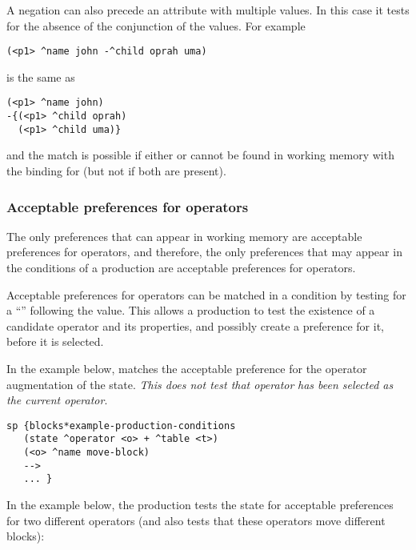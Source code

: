 A negation can also precede an attribute with multiple values.  In this case
it tests for the absence of the conjunction of the values.  For example

\begin{verbatim}
(<p1> ^name john -^child oprah uma)
\end{verbatim}

is the same as 

\begin{verbatim}
(<p1> ^name john)
-{(<p1> ^child oprah)
  (<p1> ^child uma)}
\end{verbatim}

and the match is possible if either  or
 cannot be found in working memory with the
binding for  (but not if both are present).

\subsubsection{Acceptable preferences for operators}
\label{SYNTAX-pm-acceptable}
\index{+}

The only preferences that can appear in working memory are acceptable
preferences for operators, and therefore, the only preferences that may appear
in the conditions of a production are acceptable preferences for operators.

Acceptable preferences for operators can be matched in a condition by testing
for a ``\soar{+}'' following the value.  This allows a production to test the
existence of a candidate operator and its properties, and possibly create a
preference for it, before it is selected.

In the example below,  matches the acceptable
preference for the operator augmentation of the state. \emph{This does not
test that operator}  \emph{has been selected as the current
operator}.

\begin{verbatim}
sp {blocks*example-production-conditions
   (state ^operator <o> + ^table <t>)
   (<o> ^name move-block)
   -->
   ... }
\end{verbatim}


In the example below, the production tests the state for acceptable
preferences for two different operators (and also tests that these operators
move different blocks):

